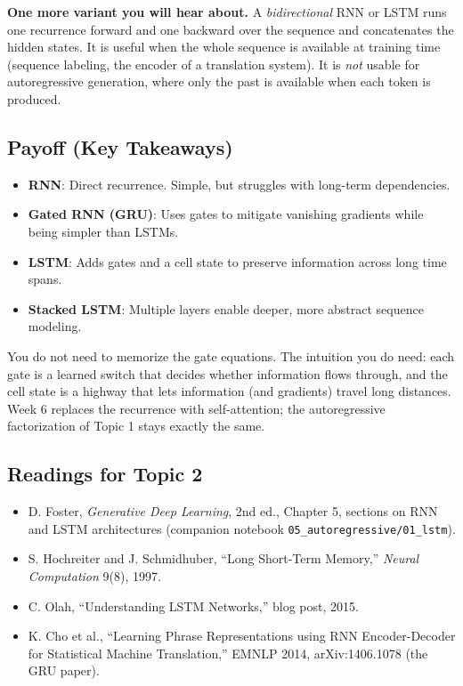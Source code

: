 \documentclass[11pt]{article}
\theoremstyle{remark}
\begin{document}
\noindent \textbf{One more variant you will hear about.} A \emph{bidirectional} RNN or LSTM runs one recurrence forward and one backward over the sequence and concatenates the hidden states. It is useful when the whole sequence is available at training time (sequence labeling, the encoder of a translation system). It is \emph{not} usable for autoregressive generation, where only the past is available when each token is produced.

\subsection{Payoff (Key Takeaways)}
\begin{itemize}
    \item \textbf{RNN}: Direct recurrence. Simple, but struggles with long-term dependencies.
    \item \textbf{Gated RNN (GRU)}: Uses gates to mitigate vanishing gradients while being simpler than LSTMs.
    \item \textbf{LSTM}: Adds gates and a cell state to preserve information across long time spans.
    \item \textbf{Stacked LSTM}: Multiple layers enable deeper, more abstract sequence modeling.
\end{itemize}
You do not need to memorize the gate equations. The intuition you do need: each gate is a learned switch that decides whether information flows through, and the cell state is a highway that lets information (and gradients) travel long distances. Week 6 replaces the recurrence with self-attention; the autoregressive factorization of Topic 1 stays exactly the same.

\subsection*{Readings for Topic 2}
\begin{itemize}[nosep]\raggedright
\item D. Foster, \emph{Generative Deep Learning}, 2nd ed., Chapter 5, sections on RNN and LSTM architectures (companion notebook \texttt{05\_autoregressive/01\_lstm}).
\item S. Hochreiter and J. Schmidhuber, ``Long Short-Term Memory,'' \emph{Neural Computation} 9(8), 1997.
\item C. Olah, ``Understanding LSTM Networks,'' blog post, 2015.
\item K. Cho et al., ``Learning Phrase Representations using RNN Encoder-Decoder for Statistical Machine Translation,'' EMNLP 2014, arXiv:1406.1078 (the GRU paper).
\end{itemize}
\end{document}
